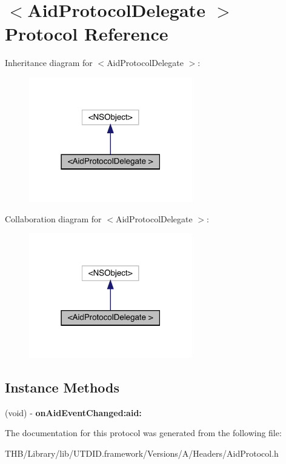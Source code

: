 \hypertarget{protocol_aid_protocol_delegate_01-p}{}\section{$<$Aid\+Protocol\+Delegate $>$ Protocol Reference}
\label{protocol_aid_protocol_delegate_01-p}


Inheritance diagram for $<$Aid\+Protocol\+Delegate $>$\+:\nopagebreak
\begin{figure}[H]
\begin{center}
\leavevmode
\includegraphics[width=202pt]{protocol_aid_protocol_delegate_01-p__inherit__graph}
\end{center}
\end{figure}


Collaboration diagram for $<$Aid\+Protocol\+Delegate $>$\+:\nopagebreak
\begin{figure}[H]
\begin{center}
\leavevmode
\includegraphics[width=202pt]{protocol_aid_protocol_delegate_01-p__coll__graph}
\end{center}
\end{figure}
\subsection*{Instance Methods}
\begin{DoxyCompactItemize}
\item 
\mbox{\label{protocol_aid_protocol_delegate_01-p_aa50e7e868a282c403eeb566c1f8bb43c}} 
(void) -\/ {\bfseries on\+Aid\+Event\+Changed\+:aid\+:}
\end{DoxyCompactItemize}


The documentation for this protocol was generated from the following file\+:\begin{DoxyCompactItemize}
\item 
T\+H\+B/\+Library/lib/\+U\+T\+D\+I\+D.\+framework/\+Versions/\+A/\+Headers/Aid\+Protocol.\+h\end{DoxyCompactItemize}
